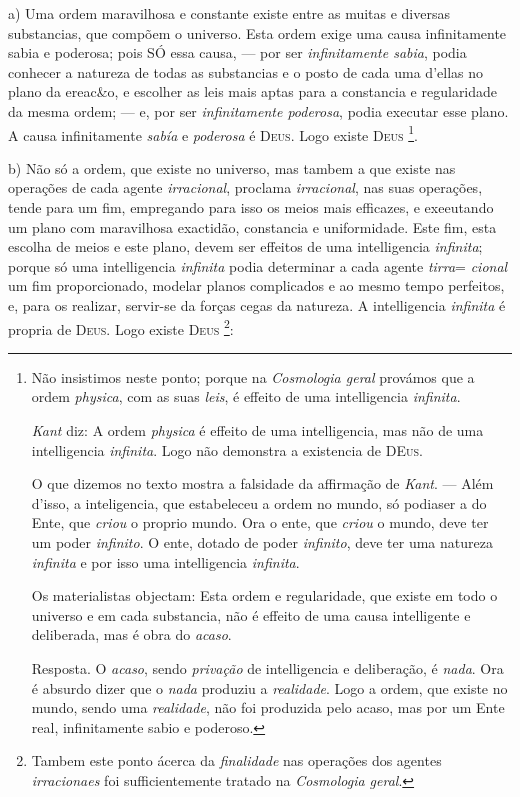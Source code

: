 a) Uma ordem maravilhosa e constante existe entre as muitas e diversas substancias, que compõem o universo. Esta ordem exige uma causa infinitamente sabia e poderosa; pois SÓ essa causa, --- por ser \emph{infinitamente sabia}, podia conhecer a natureza de todas as substancias e o posto de cada uma d'ellas no plano da ereac\&o, e escolher as leis mais aptas para a constancia e regularidade da mesma ordem; --- e, por ser \emph{infinitamente poderosa}, podia executar esse plano. A causa infinitamente \emph{sabía} e \emph{poderosa} é \textsc{Deus}. Logo existe \textsc{Deus} \footnote{Não insistimos neste ponto; porque na \emph{Cosmologia geral} provámos que a ordem \emph{physica}, com as suas \emph{leis}, é effeito de uma intelligencia \emph{infinita}.\par \emph{Kant} diz: A ordem \emph{physica} é effeito de uma intelligencia, mas não de uma intelligencia \emph{infinita}. Logo não demonstra a existencia de \textsc{DEus}.\par O que dizemos no texto mostra a falsidade da affirmação de \emph{Kant}. --- Além d'isso, a inteligencia, que estabeleceu a ordem no mundo, só podiaser a do Ente, que \emph{criou} o proprio mundo. Ora o ente, que \emph{criou} o mundo, deve ter um poder \emph{infinito}. O ente, dotado de poder \emph{infinito}, deve ter uma natureza \emph{infinita} e por isso uma intelligencia \emph{infinita}.\par Os materialistas objectam: Esta ordem e regularidade, que existe em todo o universo e em cada substancia, não é effeito de uma causa intelligente e deliberada, mas é obra do \emph{acaso}.\par Resposta. O \emph{acaso}, sendo \emph{privação} de intelligencia e deliberação, é \emph{nada}. Ora é absurdo dizer que o \emph{nada} produziu a \emph{realidade}. Logo a ordem, que existe no mundo, sendo uma \emph{realidade}, não foi produzida pelo acaso, mas por um Ente real, infinitamente sabio e poderoso.}.

b) Não só a ordem, que existe no universo, mas tambem a que existe nas operações de cada agente \emph{irracional}, proclama  \emph{irracional}, nas suas operações, tende para um fim, empregando para isso os meios mais efficazes, e exeeutando um plano com maravilhosa exactidão, constancia e uniformidade. Este fim, esta escolha de meios e este plano, devem ser effeitos de uma intelligencia \emph{infinita}; porque só uma intelligencia \emph{infinita} podia determinar a cada agente \emph{tirra}= \emph{cional} um fim proporcionado, modelar planos complicados e ao mesmo tempo perfeitos, e, para os realizar, servir-se da forças cegas da natureza. A intelligencia \emph{infinita} é propria de \textsc{Deus}. Logo existe \textsc{Deus} \footnote{Tambem este ponto ácerca da \emph{finalidade} nas operações dos agentes \emph{irracionaes} foi sufficientemente tratado na \emph{Cosmologia geral}.}:

